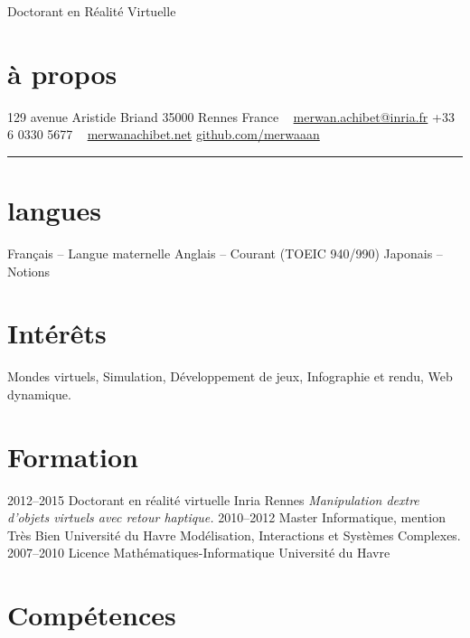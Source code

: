 \documentclass[]{friggeri-cv}
\begin{document}
       {Doctorant en Réalité Virtuelle}
			
\begin{aside}
  \section{à propos}\vspace{.25cm}
    129 avenue Aristide Briand
    35000 Rennes
    France
    ~
    \href{mailto:merwan.achibet@inria.fr}{merwan.achibet@inria.fr}
    +33 6 0330 5677
		~
    \href{http://merwanachibet.net}{merwanachibet.net}
    \href{http://github.com/merwaaan}{github.com/merwaaan}
    {\color{lightergray}\rule{3cm}{0.01cm}}
	\section{langues}\vspace{.25cm}
		Français {\footnotesize -- Langue maternelle}\vspace{.4cm}
		Anglais {\footnotesize -- Courant}
		{\footnotesize (TOEIC 940/990)}\vspace{.4cm}
		Japonais {\footnotesize -- Notions}
\end{aside}

\section{Intérêts}

Mondes virtuels, Simulation, Développement de jeux, Infographie et rendu, Web dynamique.

\section{Formation}

\begin{entrylist}
  \entry
    {2012–2015}
    {Doctorant en réalité virtuelle}
    {Inria Rennes}
    {\it Manipulation dextre d’objets virtuels avec retour haptique.}
  \entry
    {2010–2012}
    {Master Informatique, mention Très Bien}
    {Université du Havre}
    {Modélisation, Interactions et Systèmes Complexes.}
  \entry
    {2007–2010}
    {Licence Mathématiques-Informatique}
    {Université du Havre}
    {}
\end{entrylist}

\section{Compétences}
\end{document}
